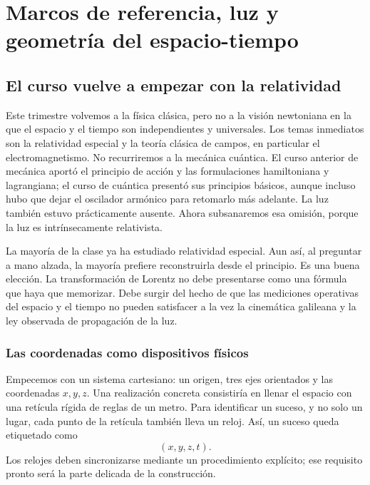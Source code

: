 \chapter{Marcos de referencia, luz y geometría del espacio-tiempo}

\section{El curso vuelve a empezar con la relatividad}

Este trimestre volvemos a la física clásica, pero no a la visión newtoniana en la que el espacio y el tiempo son independientes y universales. Los temas inmediatos son la relatividad especial y la teoría clásica de campos, en particular el electromagnetismo. No recurriremos a la mecánica cuántica. El curso anterior de mecánica aportó el principio de acción y las formulaciones hamiltoniana y lagrangiana; el curso de cuántica presentó sus principios básicos, aunque incluso hubo que dejar el oscilador armónico para retomarlo más adelante. La luz también estuvo prácticamente ausente. Ahora subsanaremos esa omisión, porque la luz es intrínsecamente relativista.

La mayoría de la clase ya ha estudiado relatividad especial. Aun así, al preguntar a mano alzada, la mayoría prefiere reconstruirla desde el principio. Es una buena elección. La transformación de Lorentz no debe presentarse como una fórmula que haya que memorizar. Debe surgir del hecho de que las mediciones operativas del espacio y el tiempo no pueden satisfacer a la vez la cinemática galileana y la ley observada de propagación de la luz.

\subsection{Las coordenadas como dispositivos físicos}

Empecemos con un sistema cartesiano: un origen, tres ejes orientados y las coordenadas \(x,y,z\). Una realización concreta consistiría en llenar el espacio con una retícula rígida de reglas de un metro. Para identificar un suceso, y no solo un lugar, cada punto de la retícula también lleva un reloj. Así, un suceso queda etiquetado como
\begin{equation}
(x,y,z,t).
\end{equation}
Los relojes deben sincronizarse mediante un procedimiento explícito; ese requisito pronto será la parte delicada de la construcción.

